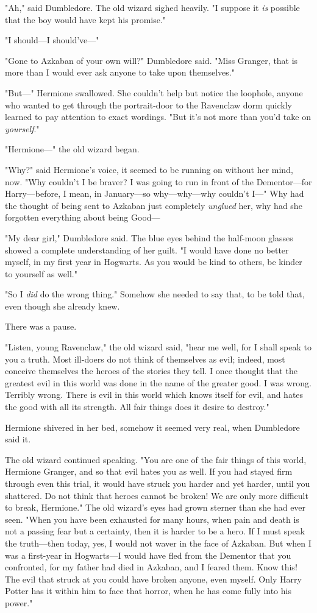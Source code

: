 "Ah," said Dumbledore. The old wizard sighed heavily. "I suppose it \emph{is}
possible that the boy would have kept his promise."

"I should---I should've\mbox{---}"

"Gone to Azkaban of your own will?" Dumbledore said. "Miss Granger, that is
more than I would ever ask anyone to take upon themselves."

"But\mbox{---}" Hermione swallowed. She couldn't help but notice the loophole, anyone
who wanted to get through the portrait-door to the Ravenclaw dorm quickly
learned to pay attention to exact wordings. "But it's not more than you'd take
on \emph{yourself}."

"Hermione\mbox{---}" the old wizard began.

"Why?" said Hermione's voice, it seemed to be running on without her mind, now.
"Why couldn't I be braver? I was going to run in front of the Dementor---for
Harry---before, I mean, in January---so why---why---why couldn't I\mbox{---}" Why had
the thought of being sent to Azkaban just completely \emph{unglued} her, why
had she forgotten everything about being Good---

"My dear girl," Dumbledore said. The blue eyes behind the half-moon glasses
showed a complete understanding of her guilt. "I would have done no better
myself, in my first year in Hogwarts. As you would be kind to others, be kinder
to yourself as well."

"So I \emph{did} do the wrong thing." Somehow she needed to say that, to be
told that, even though she already knew.

There was a pause.

"Listen, young Ravenclaw," the old wizard said, "hear me well, for I shall
speak to you a truth. Most ill-doers do not think of themselves as evil;
indeed, most conceive themselves the heroes of the stories they tell. I once
thought that the greatest evil in this world was done in the name of the
greater good. I was wrong. Terribly wrong. There is evil in this world which
knows itself for evil, and hates the good with all its strength. All fair
things does it desire to destroy."

Hermione shivered in her bed, somehow it seemed very real, when Dumbledore said
it.

The old wizard continued speaking. "You are one of the fair things of this
world, Hermione Granger, and so that evil hates you as well. If you had stayed
firm through even this trial, it would have struck you harder and yet harder,
until you shattered. Do not think that heroes cannot be broken! We are only
more difficult to break, Hermione." The old wizard's eyes had grown sterner
than she had ever seen. "When you have been exhausted for many hours, when pain
and death is not a passing fear but a certainty, then it is harder to be a
hero. If I must speak the truth---then today, yes, I would not waver in the
face of Azkaban. But when I was a first-year in Hogwarts---I would have fled
from the Dementor that you confronted, for my father had died in Azkaban, and I
feared them. Know this! The evil that struck at you could have broken anyone,
even myself. Only Harry Potter has it within him to face that horror, when he
has come fully into his power."

